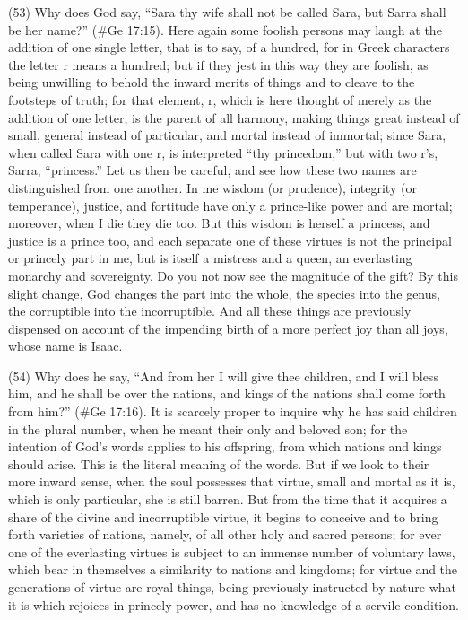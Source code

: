 (53) Why does God say, ``Sara thy wife shall not be called Sara, but Sarra shall be her name?''
(\#Ge 17:15). Here again some foolish persons may laugh at the addition of one single letter,
that is to say, of a hundred, for in Greek characters the letter r means a hundred; but if they jest in
this way they are foolish, as being unwilling to behold the inward merits of things and to cleave to
the footsteps of truth; for that element, r, which is here thought of merely as the addition of one
letter, is the parent of all harmony, making things great instead of small, general instead of
particular, and mortal instead of immortal; since Sara, when called Sara with one r, is interpreted
``thy princedom,'' but with two r's, Sarra, ``princess.'' Let us then be careful, and see how these two
names are distinguished from one another. In me wisdom (or prudence), integrity (or temperance),
justice, and fortitude have only a prince-like power and are mortal; moreover, when I die they die
too. But this wisdom is herself a princess, and justice is a prince too, and each separate one of
these virtues is not the principal or princely part in me, but is itself a mistress and a queen, an
everlasting monarchy and sovereignty. Do you not now see the magnitude of the gift? By this slight
change, God changes the part into the whole, the species into the genus, the corruptible into the
incorruptible. And all these things are previously dispensed on account of the impending birth of a
more perfect joy than all joys, whose name is Isaac.

(54) Why does he say, ``And from her I will give thee children, and I will bless him, and he shall be
over the nations, and kings of the nations shall come forth from him?'' (\#Ge 17:16). It is
scarcely proper to inquire why he has said children in the plural number, when he meant their only
and beloved son; for the intention of God's words applies to his offspring, from which nations and
kings should arise. This is the literal meaning of the words. But if we look to their more inward
sense, when the soul possesses that virtue, small and mortal as it is, which is only particular, she is
still barren. But from the time that it acquires a share of the divine and incorruptible virtue, it begins
to conceive and to bring forth varieties of nations, namely, of all other holy and sacred persons; for
ever one of the everlasting virtues is subject to an immense number of voluntary laws, which bear
in themselves a similarity to nations and kingdoms; for virtue and the generations of virtue are
royal things, being previously instructed by nature what it is which rejoices in princely power, and
has no knowledge of a servile condition.

